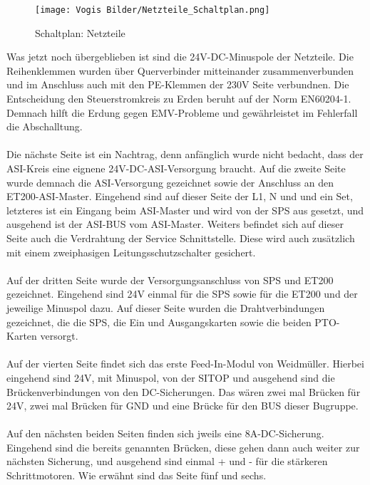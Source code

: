    \begin{figure}[h]
        \centering
        \texttt{[image: Vogis Bilder/Netzteile\_Schaltplan.png]}
        \caption{Schaltplan: Netzteile}
        \label{fig:Netzteile}
    \end{figure}Was jetzt noch übergeblieben ist sind die 24V-DC-Minuspole der Netzteile. Die Reihenklemmen wurden über Querverbinder mitteinander zusammenverbunden und im Anschluss auch mit den PE-Klemmen der 230V Seite verbundnen. Die Entscheidung den Steuerstromkreis zu Erden beruht auf der Norm EN60204-1. Demnach hilft die Erdung gegen EMV-Probleme und gewährleistet im Fehlerfall die Abschalltung. \cite{elektronet_steuerstromkreis_geerdet}\cite{beckhoff_steuerstromkreis_geerdet}\\\\
    Die nächste Seite ist ein Nachtrag, denn anfänglich wurde nicht bedacht, dass der ASI-Kreis eine eignene 24V-DC-ASI-Versorgung braucht. Auf die zweite Seite wurde demnach die ASI-Versorgung gezeichnet sowie der Anschluss an den ET200-ASI-Master. Eingehend sind auf dieser Seite der L1, N und und ein Set, letzteres ist ein Eingang beim ASI-Master und wird von der SPS aus gesetzt, und ausgehend ist der ASI-BUS vom ASI-Master. Weiters befindet sich auf dieser Seite auch die Verdrahtung der Service Schnittstelle. Diese wird auch zusätzlich mit einem zweiphasigen Leitungsschutzschalter gesichert.\\\\
    Auf der dritten Seite wurde der Versorgungsanschluss von SPS und ET200 gezeichnet. Eingehend sind 24V einmal für die SPS sowie für die ET200 und der jeweilige Minuspol dazu. Auf dieser Seite wurden die Drahtverbindungen gezeichnet, die die SPS, die Ein und Ausgangskarten sowie die beiden PTO-Karten versorgt.\\\\
    Auf der vierten Seite findet sich das erste Feed-In-Modul von Weidmüller. Hierbei eingehend sind 24V, mit Minuspol, von der SITOP und ausgehend sind die Brückenverbindungen von den DC-Sicherungen. Das wären zwei mal Brücken für 24V, zwei mal Brücken für GND und eine Brücke für den BUS dieser Bugruppe.\\\\
    Auf den nächsten beiden Seiten finden sich jweils eine 8A-DC-Sicherung. Eingehend sind die bereits genannten Brücken, diese gehen dann auch weiter zur nächsten Sicherung, und ausgehend sind einmal + und - für die stärkeren Schrittmotoren. Wie erwähnt sind das Seite fünf und sechs.\\\\
